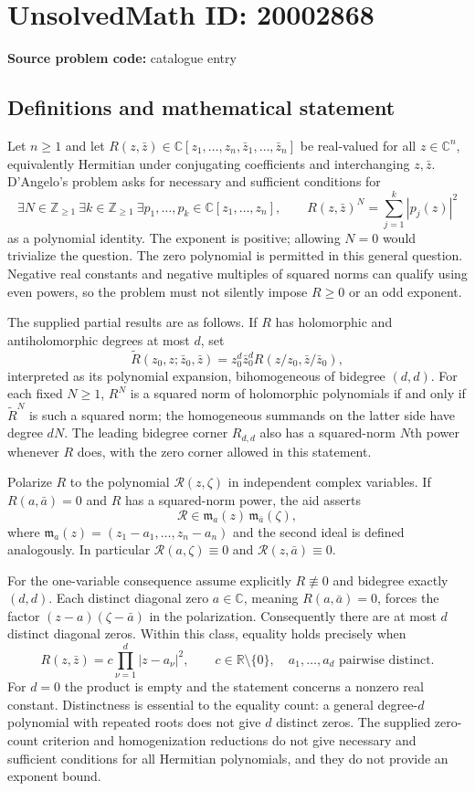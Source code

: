 \documentclass[11pt]{article}
\newcommand{\Z}{\mathbb{Z}}
\newcommand{\R}{\mathbb{R}}
\newcommand{\C}{\mathbb{C}}
\begin{document}
\section*{UnsolvedMath ID: 20002868}
\textbf{Source problem code:} catalogue entry
\subsection{Definitions and mathematical statement}
Let $n\geq1$ and let $R(z,\bar z)\in\C[z_1,\ldots,z_n,\bar z_1,\ldots,\bar z_n]$ be real-valued for all $z\in\C^n$, equivalently Hermitian under conjugating coefficients and interchanging $z,\bar z$. D'Angelo's problem asks for necessary and sufficient conditions for
\[
\exists N\in\Z_{\geq1}\ \exists k\in\Z_{\geq1}\ \exists p_1,\ldots,p_k\in\C[z_1,\ldots,z_n],\qquad
R(z,\bar z)^N=\sum_{j=1}^k|p_j(z)|^2
\]
as a polynomial identity. The exponent is positive; allowing $N=0$ would trivialize the question. The zero polynomial is permitted in this general question. Negative real constants and negative multiples of squared norms can qualify using even powers, so the problem must not silently impose $R\geq0$ or an odd exponent.

The supplied partial results are as follows. If $R$ has holomorphic and antiholomorphic degrees at most $d$, set
\[
\widetilde R(z_0,z;\bar z_0,\bar z)
=z_0^d\bar z_0^dR(z/z_0,\bar z/\bar z_0),
\]
interpreted as its polynomial expansion, bihomogeneous of bidegree $(d,d)$. For each fixed $N\geq1$, $R^N$ is a squared norm of holomorphic polynomials if and only if $\widetilde R^N$ is such a squared norm; the homogeneous summands on the latter side have degree $dN$. The leading bidegree corner $R_{d,d}$ also has a squared-norm $N$th power whenever $R$ does, with the zero corner allowed in this statement.

Polarize $R$ to the polynomial $\mathcal R(z,\zeta)$ in independent complex variables. If $R(a,\bar a)=0$ and $R$ has a squared-norm power, the aid asserts
\[
\mathcal R\in\mathfrak m_a(z)\,\mathfrak m_{\bar a}(\zeta),
\]
where $\mathfrak m_a(z)=(z_1-a_1,\ldots,z_n-a_n)$ and the second ideal is defined analogously. In particular $\mathcal R(a,\zeta)\equiv0$ and $\mathcal R(z,\bar a)\equiv0$.

For the one-variable consequence assume explicitly $R\not\equiv0$ and bidegree exactly $(d,d)$. Each distinct diagonal zero $a\in\C$, meaning $R(a,\bar a)=0$, forces the factor $(z-a)(\zeta-\bar a)$ in the polarization. Consequently there are at most $d$ distinct diagonal zeros. Within this class, equality holds precisely when
\[
R(z,\bar z)=c\prod_{\nu=1}^d|z-a_\nu|^2,
\qquad c\in\R\setminus\{0\},\quad a_1,\ldots,a_d\text{ pairwise distinct}.
\]
For $d=0$ the product is empty and the statement concerns a nonzero real constant. Distinctness is essential to the equality count: a general degree-$d$ polynomial with repeated roots does not give $d$ distinct zeros. The supplied zero-count criterion and homogenization reductions do not give necessary and sufficient conditions for all Hermitian polynomials, and they do not provide an exponent bound.
\end{document}
